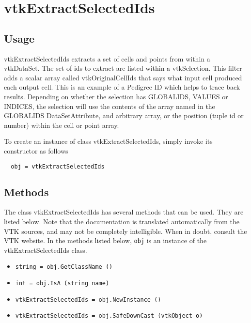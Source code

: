 \section{vtkExtractSelectedIds}

\subsection{Usage}

 vtkExtractSelectedIds extracts a set of cells and points from within a
 vtkDataSet. The set of ids to extract are listed within a vtkSelection.
 This filter adds a scalar array called vtkOriginalCellIds that says what 
 input cell produced each output cell. This is an example of a Pedigree ID 
 which helps to trace back results. Depending on whether the selection has
 GLOBALIDS, VALUES or INDICES, the selection will use the contents of the
 array named in the GLOBALIDS DataSetAttribute, and arbitrary array, or the
 position (tuple id or number) within the cell or point array.

To create an instance of class vtkExtractSelectedIds, simply
invoke its constructor as follows
\begin{verbatim}
  obj = vtkExtractSelectedIds
\end{verbatim}
\subsection{Methods}

The class vtkExtractSelectedIds has several methods that can be used.
  They are listed below.
Note that the documentation is translated automatically from the VTK sources,
and may not be completely intelligible.  When in doubt, consult the VTK website.
In the methods listed below, \verb|obj| is an instance of the vtkExtractSelectedIds class.
\begin{itemize}
\item  \verb|string = obj.GetClassName ()|

\item  \verb|int = obj.IsA (string name)|

\item  \verb|vtkExtractSelectedIds = obj.NewInstance ()|

\item  \verb|vtkExtractSelectedIds = obj.SafeDownCast (vtkObject o)|

\end{itemize}
